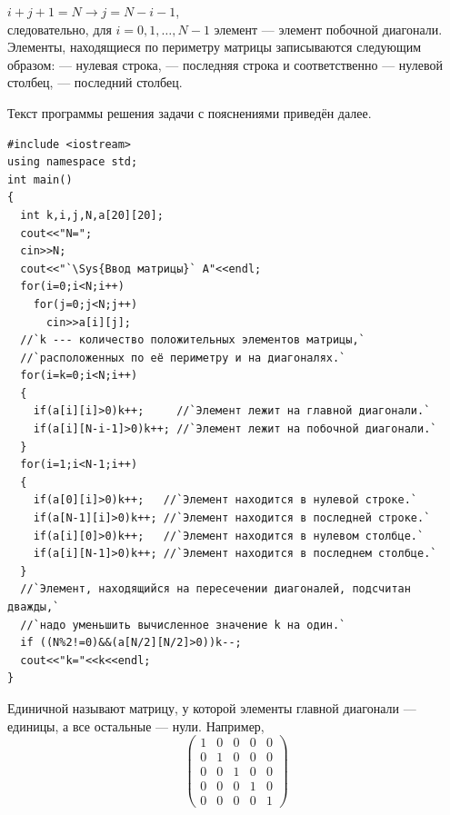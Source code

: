 $i+j+1=N \longrightarrow j=N-i-1$,\\
следовательно, для $i=0,1,\dots,N-1$ элемент  ---
элемент побочной диагонали. Элементы, находящиеся по периметру матрицы записываются 
следующим образом: 
--- нулевая строка,  --- последняя строка и соответственно  --- нулевой столбец,
 --- последний столбец.

Текст программы решения задачи с пояснениями приведён далее.
\begin{lstlisting}
#include <iostream>
using namespace std;
int main()
{
  int k,i,j,N,a[20][20]; 
  cout<<"N=";
  cin>>N;
  cout<<"`\Sys{Ввод матрицы}` A"<<endl;
  for(i=0;i<N;i++)
    for(j=0;j<N;j++)
      cin>>a[i][j];
  //`k --- количество положительных элементов матрицы,`
  //`расположенных по её периметру и на диагоналях.`
  for(i=k=0;i<N;i++)
  {
    if(a[i][i]>0)k++;     //`Элемент лежит на главной диагонали.`
    if(a[i][N-i-1]>0)k++; //`Элемент лежит на побочной диагонали.`
  }
  for(i=1;i<N-1;i++)
  {
    if(a[0][i]>0)k++;   //`Элемент находится в нулевой строке.`
    if(a[N-1][i]>0)k++; //`Элемент находится в последней строке.`
    if(a[i][0]>0)k++;   //`Элемент находится в нулевом столбце.`
    if(a[i][N-1]>0)k++; //`Элемент находится в последнем столбце.`
  }
  //`Элемент, находящийся на пересечении диагоналей, подсчитан дважды,`
  //`надо уменьшить вычисленное значение k на один.` 
  if ((N%2!=0)&&(a[N/2][N/2]>0))k--;
  cout<<"k="<<k<<endl;
}
\end{lstlisting}



Единичной называют матрицу, у которой элементы главной диагонали --- единицы, а все остальные --- нули. Например, 
$$\left(\begin{matrix}1&0&0&0&0\\0&1&0&0&0\\0&0&1&0&0\\0&0&0&1&0\\0&0&0&0&1\end{matrix}\right)$$

